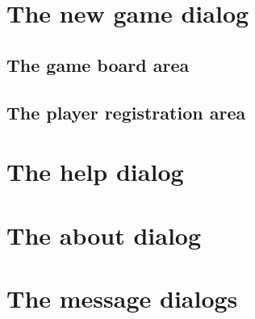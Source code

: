 \section{The new game dialog} \label{dlg:NewGame}
  \subsection{The game board area}
  \subsection{The player registration area} \label{dlg:PlayerReg}
\section{The help dialog} \label{dlg:Help}
\section{The about  dialog} \label{dlg:AboutCX}
\section{The message dialogs} \label{dlg::message}

